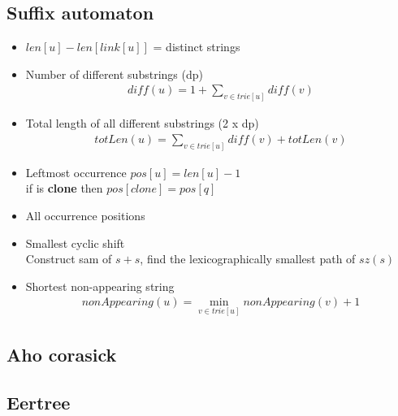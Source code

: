 
\subsection{Suffix automaton}
\vspace{-5pt}
\begin{itemize}[noitemsep]
  \item 
  $len[u] - len[link[u]]$ = distinct strings

  \item Number of different substrings (dp)
  \begin{gather*}
    diff(u)=1+\sum_{v \in trie[u]}{diff(v)}
  \end{gather*}

  \item Total length of all different substrings (2 x dp)
  \begin{gather*}
    totLen(u)=\sum_{v \in trie[u]}{diff(v) + totLen(v)}
  \end{gather*}
  
  \item Leftmost occurrence
  $pos[u] = len[u] - 1$ \\
  if is \textbf{clone} then $pos[clone] = pos[q]$ 
  
  \item All occurrence positions
  
  \item Smallest cyclic shift \\
  Construct sam of $s + s$, find the lexicographically smallest path of $sz(s)$
 
  \item Shortest non-appearing string
  \begin{gather*}
    nonAppearing(u) = \min_{v \in trie[u]}{nonAppearing(v) + 1}
  \end{gather*}
\end{itemize}
\vspace{-15pt}

\subsection{Aho corasick}

\subsection{Eertree}
